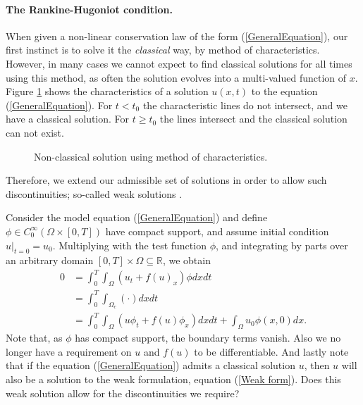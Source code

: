 \documentclass[10pt]{article}
\numberwithin{equation}{section}
\begin{document}
\paragraph{The Rankine-Hugoniot condition.}
When given a non-linear conservation law of the form (\ref{GeneralEquation}), our first instinct is to solve it the \textit{classical} way, by method of characteristics. However, in many cases we cannot expect to find classical solutions for all times using this method, as often the solution evolves into a multi-valued function of $x$. Figure \ref{Fig:Multivalued} shows the characteristics of a solution $u(x,t)$ to the equation (\ref{GeneralEquation}). For $t < t_0$ the characteristic lines do not intersect, and we have a classical solution. For $t \geq t_0$ the lines intersect and the classical solution can not exist. 
\begin{figure}
\begin{center}

\caption{Non-classical solution using method of characteristics.}
\label{Fig:Multivalued}
\end{center}
\end{figure}
Therefore, we extend our admissible set of solutions in order to allow such discontinuities; so-called weak solutions \cite{HoldenH.Helge2015Ftfh}. 

Consider the model equation (\ref{GeneralEquation}) and define $\phi \in C_0^{\infty}(\Omega \times [0, T])$ have compact support, and assume initial condition $u|_{t=0} = u_0 $. Multiplying with the test function $\phi$, and integrating by parts over an arbitrary domain $[0,T] \times \Omega \subseteq \mathbb{R}$, we obtain
\begin{align}
    0 &= \int_0^T \int_{\Omega} (u_t + f(u)_x)\phi dxdt \nonumber \\
      &= \int_0^T \int_{\Omega_c} (\cdot) dxdt \nonumber \\ 
      &= \int_0^T \int_{\Omega} (u \phi_t + f(u)\phi_x) dxdt + \int_{\Omega} u_0 \phi(x,0) dx. 
    \label{Weak form}
\end{align}
Note that, as $\phi$ has compact support, the boundary terms vanish. Also we no longer have a requirement on $u$ and $f(u)$ to be differentiable. And lastly note that if the equation (\ref{GeneralEquation}) admits a classical solution $u$, then $u$ will also be a solution to the weak formulation, equation (\ref{Weak form}). Does this weak solution allow for the discontinuities we require?
\end{document}
